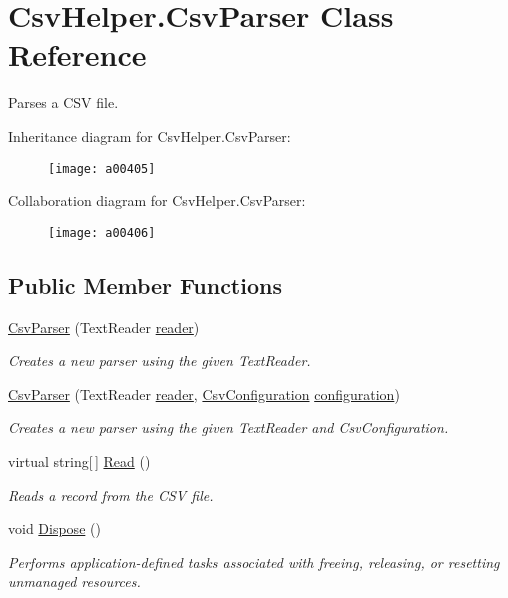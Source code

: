 \hypertarget{a00067}{\section{Csv\-Helper.\-Csv\-Parser Class Reference}
\label{a00067}
}


Parses a C\-S\-V file.  




Inheritance diagram for Csv\-Helper.\-Csv\-Parser\-:
\nopagebreak
\begin{figure}[H]
\begin{center}
\leavevmode
\texttt{[image: a00405]}
\end{center}
\end{figure}


Collaboration diagram for Csv\-Helper.\-Csv\-Parser\-:
\nopagebreak
\begin{figure}[H]
\begin{center}
\leavevmode
\texttt{[image: a00406]}
\end{center}
\end{figure}
\subsection*{Public Member Functions}
\begin{DoxyCompactItemize}
\item 
\hyperlink{a00067_a28afb6761bc195a6f20c284c46811b76}{Csv\-Parser} (Text\-Reader \hyperlink{a00067_a6ab23daf45e84a211b4010c213504f7e}{reader})
\begin{DoxyCompactList}\small\item\em Creates a new parser using the given Text\-Reader. \end{DoxyCompactList}\item 
\hyperlink{a00067_a94820d35d587215da53e0a5f2bf229d0}{Csv\-Parser} (Text\-Reader \hyperlink{a00067_a6ab23daf45e84a211b4010c213504f7e}{reader}, \hyperlink{a00062}{Csv\-Configuration} \hyperlink{a00067_aeb171813d1526839ccd41d60ab6483b2}{configuration})
\begin{DoxyCompactList}\small\item\em Creates a new parser using the given Text\-Reader and Csv\-Configuration. \end{DoxyCompactList}\item 
virtual string\mbox{[}$\,$\mbox{]} \hyperlink{a00067_a8e938842c6267343128babd111df9710}{Read} ()
\begin{DoxyCompactList}\small\item\em Reads a record from the C\-S\-V file. \end{DoxyCompactList}\item 
void \hyperlink{a00067_aa13f93a198206179cd19cdc12332d842}{Dispose} ()
\begin{DoxyCompactList}\small\item\em Performs application-\/defined tasks associated with freeing, releasing, or resetting unmanaged resources. \end{DoxyCompactList}\end{DoxyCompactItemize}
